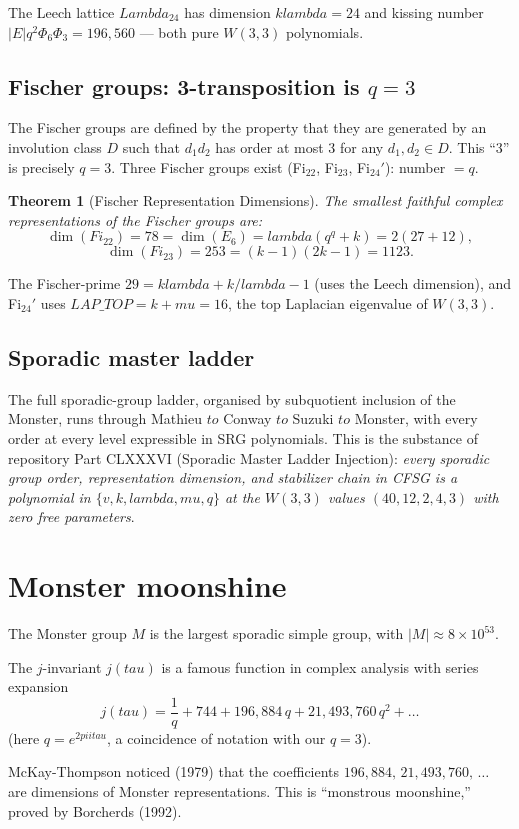 \documentclass[11pt]{article}
\def\mathbb#1{#1}%
\def\mathrm#1{#1}%
\def\mathbf#1{#1}%
\def\textbf#1{#1}%
\def\lambda{lambda}%
\def\Lambda{Lambda}%
\def\mu{mu}%
\def\Phi#1{Phi#1}%
\def\pi{pi}%
\def\tau{tau}%
\def\cdot{ }%
\def\to{ to }%
\newtheorem*{theorem}{Theorem}
\begin{document}
The Leech lattice $\Lambda_{24}$ has dimension $k\lambda = 24$ and kissing number $|E|\cdot q^2 \cdot \Phi_6 \cdot \Phi_3 = 196{,}560$ --- both pure $W(3,3)$ polynomials.

\subsection*{Fischer groups: 3-transposition is $q = 3$}

The Fischer groups are defined by the property that they are generated by an involution class $D$ such that $d_1 d_2$ has order at most $\mathbf{3}$ for any $d_1, d_2 \in D$. \textbf{This ``3'' is precisely $q = 3$.} Three Fischer groups exist (Fi$_{22}$, Fi$_{23}$, Fi$_{24}'$): number $= q$.

\begin{theorem}[Fischer Representation Dimensions]
The smallest faithful complex representations of the Fischer groups are:
\[
\dim(\mathrm{Fi}_{22}) = 78 = \dim(E_6) = \lambda \cdot (q^q + k) = 2(27 + 12),
\]
\[
\dim(\mathrm{Fi}_{23}) = 253 = (k-1)(2k-1) = 11 \cdot 23.
\]
\end{theorem}

The Fischer-prime $29 = k\lambda + k/\lambda - 1$ (uses the Leech dimension), and Fi$_{24}'$ uses $\mathrm{LAP\_TOP} = k + \mu = 16$, the top Laplacian eigenvalue of $W(3,3)$.

\subsection*{Sporadic master ladder}

The full sporadic-group ladder, organised by subquotient inclusion of the Monster, runs through Mathieu $\to$ Conway $\to$ Suzuki $\to$ Monster, with every order at every level expressible in SRG polynomials. This is the substance of repository Part CLXXXVI (Sporadic Master Ladder Injection): \emph{every sporadic group order, representation dimension, and stabilizer chain in CFSG is a polynomial in $\{v, k, \lambda, \mu, q\}$ at the $W(3,3)$ values $(40, 12, 2, 4, 3)$ with zero free parameters}.

\section{Monster moonshine}

\label{sec:monster-moonshine}

\begin{mathnote}
The \textbf{Monster group} $\mathbb{M}$ is the largest sporadic simple group, with $|\mathbb{M}| \approx 8 \times 10^{53}$.

The \textbf{$j$-invariant} $j(\tau)$ is a famous function in complex analysis with series expansion
\[
j(\tau) = \frac{1}{q} + 744 + 196{,}884 \, q + 21{,}493{,}760\, q^2 + \ldots
\]
(here $q = e^{2\pi i \tau}$, a coincidence of notation with our $q = 3$).

McKay-Thompson noticed (1979) that the coefficients $196{,}884,\, 21{,}493{,}760,\, \ldots$ are dimensions of Monster representations. This is ``monstrous moonshine,'' proved by Borcherds (1992).
\end{mathnote}
\end{document}
